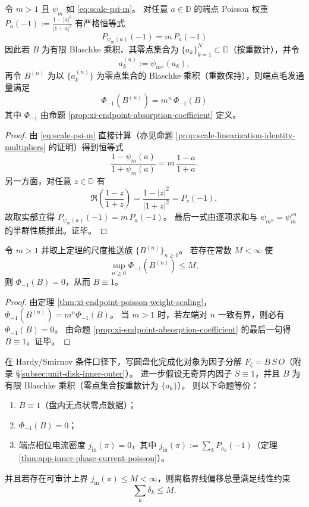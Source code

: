 \begin{theorem}\label{thm:xi-endpoint-poisson-weight-scaling}
令 \(m>1\) 且 \(\psi_m\) 如 \eqref{eq:scale-psi-m}。
对任意 \(a\in\mathbb{D}\) 的端点 Poisson 权重
\(
P_a(-1):=\frac{1-|a|^2}{|1+a|^2}
\)
有严格恒等式
\[
\boxed{\;P_{\psi_m(a)}(-1)=m\,P_a(-1)\;}
\]
因此若 \(B\) 为有限 Blaschke 乘积、其零点集合为 \(\{a_k\}_{k=1}^{N}\subset\mathbb{D}\)（按重数计），并令
\[
a_k^{(n)}:=\psi_{m^n}(a_k),
\]
再令 \(B^{(n)}\) 为以 \(\{a_k^{(n)}\}\) 为零点集合的 Blaschke 乘积（重数保持），则端点毛发通量满足
\[
\boxed{\;\Phi_{-1}(B^{(n)})=m^n\,\Phi_{-1}(B)\;}
\]
其中 \(\Phi_{-1}\) 由命题 \ref{prop:xi-endpoint-absorption-coefficient} 定义。
\end{theorem}

\begin{proof}
由 \eqref{eq:scale-psi-m} 直接计算（亦见命题 \ref{prop:scale-linearization-identity-multipliers} 的证明）得到恒等式
\[
\frac{1-\psi_m(a)}{1+\psi_m(a)}=m\,\frac{1-a}{1+a}.
\]
另一方面，对任意 \(z\in\mathbb{D}\) 有
\[
\Re\!\left(\frac{1-z}{1+z}\right)=\frac{1-|z|^2}{|1+z|^2}=P_z(-1),
\]
故取实部立得 \(P_{\psi_m(a)}(-1)=m\,P_a(-1)\)。
最后一式由逐项求和与 \(\psi_{m^n}=\psi_m^{\circ n}\) 的半群性质推出。证毕。
\end{proof}

\begin{corollary}[跨尺度闭合 \texorpdfstring{$\Longrightarrow$}{=>} 无毛发固定点]\label{cor:xi-nohair-fixedpoint-flux-closure}
令 \(m>1\) 并取上定理的尺度推送族 \(\{B^{(n)}\}_{n\ge 0}\)。
若存在常数 \(M<\infty\) 使
\[
\sup_{n\ge 0}\Phi_{-1}(B^{(n)})\le M,
\]
则 \(\Phi_{-1}(B)=0\)，从而 \(B\equiv 1\)。
\end{corollary}

\begin{proof}
由定理 \ref{thm:xi-endpoint-poisson-weight-scaling}，\(\Phi_{-1}(B^{(n)})=m^n\Phi_{-1}(B)\)。
当 \(m>1\) 时，若左端对 \(n\) 一致有界，则必有 \(\Phi_{-1}(B)=0\)。
由命题 \ref{prop:xi-endpoint-absorption-coefficient} 的最后一句得 \(B\equiv 1\)。证毕。
\end{proof}

\begin{corollary}\label{cor:xi-extreme-resonance-criterion}
在 Hardy/Smirnov 条件口径下，写圆盘化完成化对象为因子分解 \(F_{\zeta}=B\,S\,O\)（附录 \S\ref{subsec:unit-disk-inner-outer}）。
进一步假设无奇异内因子 \(S\equiv 1\)，并且 \(B\) 为有限 Blaschke 乘积（零点集合按重数计为 \(\{a_k\}\)）。
则以下命题等价：
\begin{enumerate}
  \item \(B\equiv 1\)（盘内无点状零点数据）；
  \item \(\Phi_{-1}(B)=0\)；
  \item 端点相位电流密度 \(j_{\mathrm{in}}(\pi)=0\)，其中 \(j_{\mathrm{in}}(\pi):=\sum_k P_{a_k}(-1)\)（定理 \ref{thm:app-inner-phase-current-poisson}）。
\end{enumerate}
并且若存在可审计上界 \(j_{\mathrm{in}}(\pi)\le M<\infty\)，则离临界线偏移总量满足线性约束
\[
\sum_k\delta_k\le M.
\]
\end{corollary}


